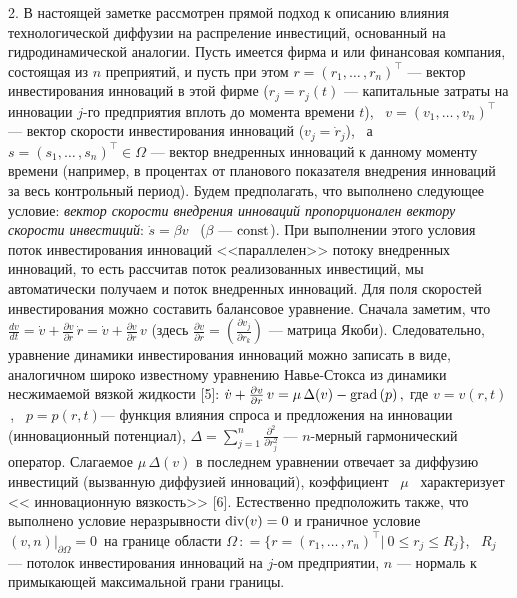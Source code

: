 2. В настоящей заметке рассмотрен прямой подход к описанию влияния
технологической диффузии на распреление инвестиций, основанный на
гидродинамической аналогии. Пусть имеется фирма и или финансовая
компания, состоящая из  $n$ преприятий, и пусть при этом
$r=\left(r_1,\dots\,, r_n\right)^\top$ --- вектор инвестирования
инноваций в этой фирме ($r_j = r_j(t)$  --- капитальные затраты на
инновации $j$-го предприятия вплоть до момента времени $t$), \
$v=\left(v_1,\dots\,, v_n\right)^\top$ --- вектор скорости
инвестирования инноваций ($v_j = \dot{r}_j$), \ а
$s=\left(s_1,\dots\,, s_n\right)^\top\in\Omega$ --- вектор
внедренных инноваций к данному моменту времени (например, в
процентах от планового показателя внедрения инноваций за весь
контрольный период). Будем предполагать, что выполнено следующее
условие: {\em вектор скорости внедрения инноваций пропорционален
вектору скорости инвестиций}: $\dot s = \beta v$ \ ($\beta$ ---
${\rm const}$). При выполнении этого условия поток инвестирования
инноваций <<параллелен>> потоку внедренных инноваций, то есть
рассчитав поток реализованных инвестиций, мы автоматически получаем
и поток внедренных инноваций. Для поля скоростей инвестирования
можно составить балансовое уравнение. Сначала заметим, что
 $
\frac{dv}{dt} = \dot{v} + \frac{\partial v}{\partial r}\,\dot{r} =
\dot{v}  + \frac{\partial v}{\partial r}\,v
 $
(здесь $\frac{\partial v}{\partial r} = \left(\frac{\partial
v_j}{\partial r_k}\right)$ --- матрица Якоби). Следовательно,
уравнение динамики инвестирования инноваций можно записать в виде,
аналогичном широко известному уравнению Навье-Стокса из динамики
несжимаемой вязкой жидкости [5]:
 $
\dot{v}  + \frac{\partial v}{\partial r}\,v = \mu \, \Delta(v) -
{\rm grad}\, (p) \,,
 $
где $v = v(r,t)$\,, \ $p = p(r,t)$--- функция влияния спроса и
предложения на инновации (инновационный потенциал), $\Delta =
\sum\limits_{j=1}^n \frac{\partial^2}{\partial r_j^2} $ ---
$n$-мерный гармонический оператор. Слагаемое $\mu \, \Delta(v)$ в
последнем уравнении отвечает за диффузию инвестиций (вызванную
диффузией инноваций), коэффициент \ $\mu$ \ характеризует <<
инновационную вязкость>> [6]. Естественно предположить также, что
выполнено условие неразрывности
 $
{\rm div}(v) = 0
 $
и граничное условие
 $
(v,n)\big |_{\partial \Omega} = 0\,
 $
на границе области $\Omega \,: = \{r =\left(r_1,\dots\,,
r_n\right)^\top\big | \ 0 \le r_j \le R_j\}$, \ $R_j$ --- потолок
инвестирования инноваций на $j$-ом предприятии, $n$ --- нормаль к
примыкающей максимальной грани границы.

